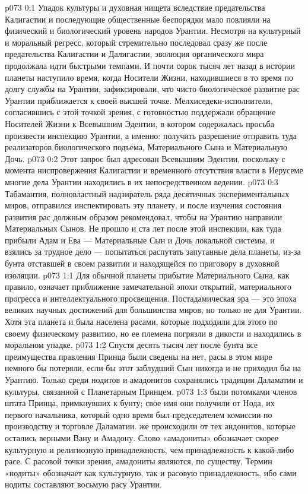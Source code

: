 \author{Солония}
\vs p073 0:1 Упадок культуры и духовная нищета вследствие предательства Калигастии и последующие общественные беспорядки мало повлияли на физический и биологический уровень народов Урантии. Несмотря на культурный и моральный регресс, который стремительно последовал сразу же после предательства Калигастии и Далигастии, эволюция органического мира продолжала идти быстрыми темпами. И почти сорок тысяч лет назад в истории планеты наступило время, когда Носители Жизни, находившиеся в то время по долгу службы на Урантии, зафиксировали, что чисто биологическое развитие рас Урантии приближается к своей высшей точке. Мелхиседеки\hyp{}исполнители, согласившись с этой точкой зрения, с готовностью поддержали обращение Носителей Жизни к Всевышним Эдентии, в котором содержалась просьба произвести инспекцию Урантии, а именно: получить разрешение отправить туда реализаторов биологического подъема, Материального Сына и Материальную Дочь.
\vs p073 0:2 Этот запрос был адресован Всевышним Эдентии, поскольку с момента ниспровержения Калигастии и временного отсутствия власти в Иерусеме многие дела Урантии находились в их непосредственном ведении.
\vs p073 0:3 Табамантия, полновластный надзиратель ряда десятичных экспериментальных миров, отправился инспектировать эту планету, и после изучения состояния развития рас должным образом рекомендовал, чтобы на Урантию направили Материальных Сынов. Не прошло и ста лет после этой инспекции, как туда прибыли Адам и Ева --- Материальные Сын и Дочь локальной системы, и взялись за трудное дело --- попытаться распутать запутанные дела планеты, из\hyp{}за бунта отставшей в своем развитии и находящейся по приговору в духовной изоляции.
\vs p073 1:1 Для обычной планеты прибытие Материального Сына, как правило, означает приближение замечательной эпохи открытий, материального прогресса и интеллектуального просвещения. Постадамическая эра --- это эпоха великих научных достижений для большинства миров, но только не для Урантии. Хотя эта планета и была населена расами, которые подходили для этого по своему физическому развитию, но ее племена погрязли в дикости и находились в моральном упадке.
\vs p073 1:2 Спустя десять тысяч лет после бунта все преимущества правления Принца были сведены на нет, расы в этом мире немного бы потеряли, если бы этот заблудший Сын никогда и не приходил бы на Урантию. Только среди нодитов и амадонитов сохранялись традиции Даламатии и культуры, связанной с Планетарным Принцем.
\vs p073 1:3  были потомками членов штата Принца, примкнувших к бунту; свое имя они получили от Нода, их первого начальника, который одно время был председателем комиссии по производству и торговле Даламатии.  же происходили от тех андонитов, которые остались верными Вану и Амадону. Слово «амадониты» обозначает скорее культурную и религиозную принадлежность, чем принадлежность к какой\hyp{}либо расе. С расовой точки зрения, амадониты являются, по существу,  Термин «нодиты» обозначает как культурную, так и расовую принадлежность, ибо сами нодиты составляют восьмую расу Урантии.
